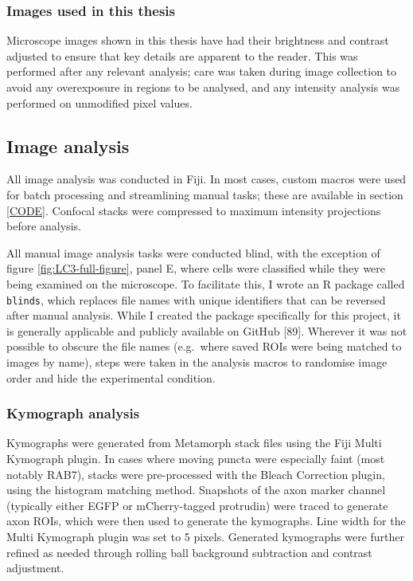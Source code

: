 \documentclass[
  12pt,
  a4paper,
]{book}
\begin{document}
\subsubsection{Images used in this thesis}\label{images-used-in-this-thesis}

Microscope images shown in this thesis have had their brightness and contrast adjusted to ensure that key details are apparent to the reader. This was performed after any relevant analysis; care was taken during image collection to avoid any overexposure in regions to be analysed, and any intensity analysis was performed on unmodified pixel values.

\subsection{Image analysis}\label{image-analysis}

All image analysis was conducted in Fiji. In most cases, custom macros were used for batch processing and streamlining manual tasks; these are available in section \ref{CODE}. Confocal stacks were compressed to maximum intensity projections before analysis.

All manual image analysis tasks were conducted blind, with the exception of figure \ref{fig:LC3-full-figure}, panel E, where cells were classified while they were being examined on the microscope. To facilitate this, I wrote an R package called \texttt{blinds}, which replaces file names with unique identifiers that can be reversed after manual analysis. While I created the package specifically for this project, it is generally applicable and publicly available on GitHub {[}89{]}. Wherever it was not possible to obscure the file names (e.g.~where saved ROIs were being matched to images by name), steps were taken in the analysis macros to randomise image order and hide the experimental condition.

\subsubsection{Kymograph analysis}\label{kymo}

Kymographs were generated from Metamorph stack files using the Fiji Multi Kymograph plugin. In cases where moving puncta were especially faint (most notably RAB7), stacks were pre-processed with the Bleach Correction plugin, using the histogram matching method. Snapshots of the axon marker channel (typically either EGFP or mCherry-tagged protrudin) were traced to generate axon ROIs, which were then used to generate the kymographs. Line width for the Multi Kymograph plugin was set to 5 pixels. Generated kymographs were further refined as needed through rolling ball background subtraction and contrast adjustment.
\end{document}

